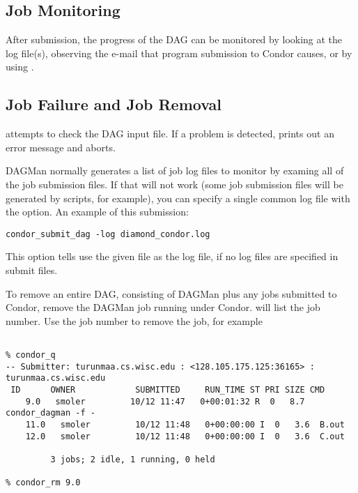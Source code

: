 \subsection{Job Monitoring}

After submission, the progress of the DAG can be monitored
by looking at the log file(s),
observing the e-mail that program submission to Condor causes,
or by using  .

\subsection{Job Failure and Job Removal}

 attempts to check the DAG input file.
If a problem is detected,
 prints out an error message and aborts.

DAGMan normally generates a list of job log files to
monitor by examing all of the job submission files.  If
that will not work (some job submission files will be generated
by  scripts, for example), you can specify a single
common log file with the  option.
An example of this submission:
\begin{verbatim}
condor_submit_dag -log diamond_condor.log
\end{verbatim}
This option tells  use the given file as
the log file, if no log files are specified in submit files.

To remove an entire DAG, consisting of DAGMan plus
any jobs submitted to Condor,
remove the DAGMan job running under Condor.
 will list the job number.
Use the job number to remove the job, for example

\footnotesize
\begin{verbatim}

% condor_q
-- Submitter: turunmaa.cs.wisc.edu : <128.105.175.125:36165> : turunmaa.cs.wisc.edu
 ID      OWNER            SUBMITTED     RUN_TIME ST PRI SIZE CMD
    9.0   smoler         10/12 11:47   0+00:01:32 R  0   8.7  condor_dagman -f -
    11.0   smoler         10/12 11:48   0+00:00:00 I  0   3.6  B.out
    12.0   smoler         10/12 11:48   0+00:00:00 I  0   3.6  C.out

         3 jobs; 2 idle, 1 running, 0 held

% condor_rm 9.0
\end{verbatim}
\normalsize

